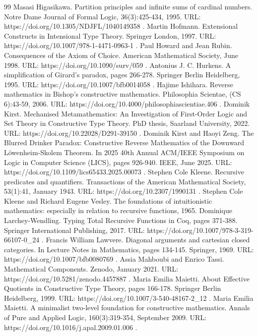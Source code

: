 \documentclass[10pt,a4paper]{amsart}
\begin{document}
\begin{thebibliography}{99}
 Masasi Higasikawa. Partition principles and infinite sums of cardinal numbers. Notre Dame Journal of Formal Logic, 36(3):425-434, 1995. URL: https://doi.org/10.1305/NDJFL/1040149358 .
 Martin Hofmann. Extensional Constructs in Intensional Type Theory. Springer London, 1997. URL: https://doi.org/10.1007/978-1-4471-0963-1 .
 Paul Howard and Jean Rubin. Consequences of the Axiom of Choice. American Mathematical Society, June 1998. URL: https://doi.org/10.1090/surv/059 .
 Antonius J. C. Hurkens. A simplification of Girard’s paradox, pages 266-278. Springer Berlin Heidelberg, 1995. URL: https://doi.org/10.1007/bfb0014058 .
 Hajime Ishihara. Reverse mathematics in Bishop’s constructive mathematics. Philosophia Scientae, (CS 6):43-59, 2006. URL: https://doi.org/10.4000/philosophiascientiae.406 .
 Dominik Kirst. Mechanised Metamathematics: An Investigation of First-Order Logic and Set Theory in Constructive Type Theory. PhD thesis, Saarland University, 2022. URL: https://doi.org/10.22028/D291-39150 .
 Dominik Kirst and Haoyi Zeng. The Blurred Drinker Paradox: Constructive Reverse Mathematics of the Downward Löwenheim-Skolem Theorem. In 2025 40th Annual ACM/IEEE Symposium on Logic in Computer Science (LICS), pages 926-940. IEEE, June 2025. URL: https://doi.org/10.1109/lics65433.2025.00073 .
 Stephen Cole Kleene. Recursive predicates and quantifiers. Transactions of the American Mathematical Society, 53(1):41, January 1943. URL: https://doi.org/10.2307/1990131 .
 Stephen Cole Kleene and Richard Eugene Vesley. The foundations of intuitionistic mathematics: especially in relation to recursive functions, 1965.
 Dominique Larchey-Wendling. Typing Total Recursive Functions in Coq, pages 371-388. Springer International Publishing, 2017. URL: https://doi.org/10.1007/978-3-319-66107-0\_24 .
 Francis William Lawvere. Diagonal arguments and cartesian closed categories. In Lecture Notes in Mathematics, pages 134-145. Springer, 1969. URL: https://doi.org/10.1007/bfb0080769 .
 Assia Mahboubi and Enrico Tassi. Mathematical Components. Zenodo, January 2021. URL: https://doi.org/10.5281/zenodo.4457887 .
 Maria Emilia Maietti. About Effective Quotients in Constructive Type Theory, pages 166-178. Springer Berlin Heidelberg, 1999. URL: https://doi.org/10.1007/3-540-48167-2\_12 .
 Maria Emilia Maietti. A minimalist two-level foundation for constructive mathematics. Annals of Pure and Applied Logic, 160(3):319-354, September 2009. URL: https://doi.org/10.1016/j.apal.2009.01.006 .

\end{thebibliography}
\end{document}

